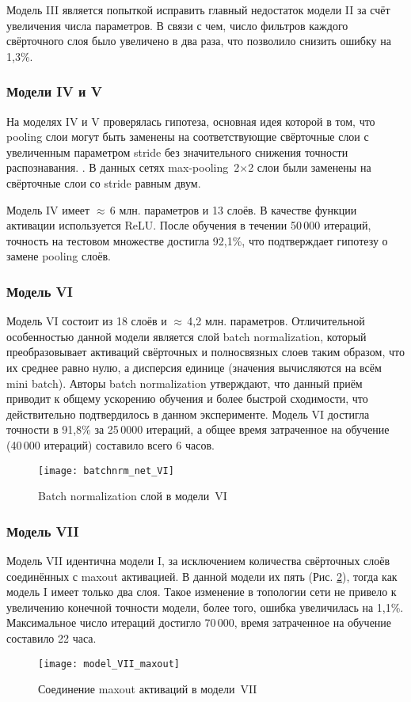 Модель III является попыткой исправить главный недостаток модели II за счёт увеличения числа параметров.
В связи с чем, число фильтров каждого свёрточного слоя было увеличено в два раза, что позволило снизить ошибку на 1,3\%.

\subsubsection{Модели IV и V}
На моделях IV и V проверялась гипотеза, основная идея которой в том, что pooling слои могут быть заменены
на соответствующие свёрточные слои с увеличенным параметром stride без значительного снижения точности распознавания.
\cite{DBLP:journals/corr/SpringenbergDBR14}. В данных сетях max-pooling~2$\times$2 слои были заменены 
на свёрточные слои со stride равным двум.

Модель IV имеет $\approx$\,6 млн. параметров и 13 слоёв. В качестве функции активации используется ReLU.
После обучения в течении 50\,000 итераций, точность на тестовом множестве достигла 92,1\%, что
подтверждает гипотезу о замене pooling слоёв.

\subsubsection{Модель VI}
Модель VI состоит из 18 слоёв и $\approx$\,4,2 млн. параметров. Отличительной особенностью данной модели является слой batch normalization, 
который преобразовывает активаций свёрточных и полносвязных слоев таким образом, что их среднее равно нулю, а
дисперсия единице (значения вычисляются на всём mini batch). Авторы batch normalization \cite{DBLP:journals/corr/IoffeS15} утверждают,
что данный приём приводит к общему ускорению обучения и более быстрой сходимости, что действительно подтвердилось в данном эксперименте.
Модель VI достигла точности в 91,8\% за 25\,0000 итераций, а общее время затраченное на обучение (40\,000 итераций) составило всего 6 часов.
\begin{figure}[H]
    \centering
    \texttt{[image: batchnrm\_net\_VI]}
    \caption{Batch normalization слой в модели~VI}
    \label{fig:model_VI_bnrm}
\end{figure}

\subsubsection{Модель VII}
Модель VII идентична модели I, за исключением количества свёрточных слоёв соединённых с maxout активацией. В данной модели их пять
(Рис. \ref{fig:model_VII_maxout}), тогда как модель I имеет только два слоя. Такое изменение в топологии сети не привело к 
увеличению конечной точности модели, более того, ошибка увеличилась на 1,1\%. Максимальное число итераций достигло 70\,000,
время затраченное на обучение составило 22 часа.
\begin{figure}[H]
    \centering
    \texttt{[image: model\_VII\_maxout]}
    \caption{Соединение maxout активаций в модели~VII}
    \label{fig:model_VII_maxout}
\end{figure}

